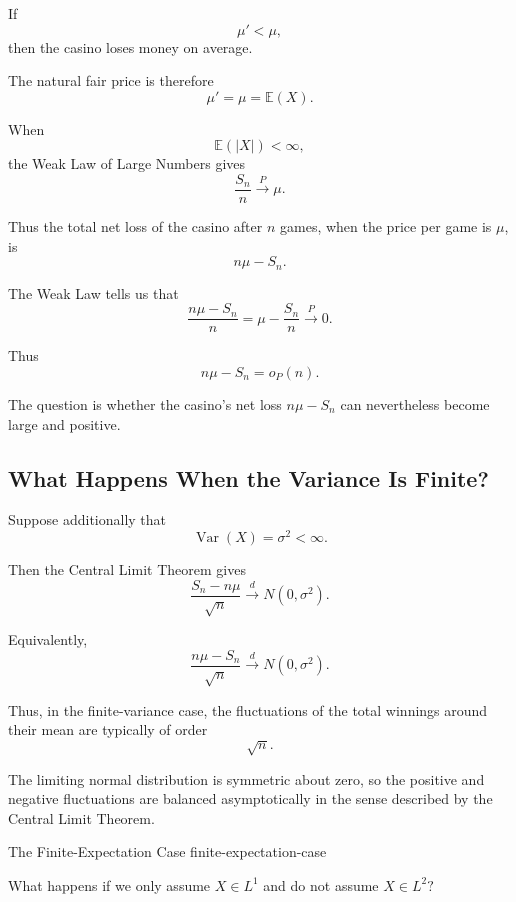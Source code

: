 \medskip

If
\[
\mu'<\mu,
\]
then the casino loses money on average.

\medskip

The natural fair price is therefore
\[
\boxed{
\mu'=\mu=\mathbb{E}(X).
}
\]

When
\[
\mathbb{E}(|X|)<\infty,
\]
the Weak Law of Large Numbers gives
\[
\frac{S_n}{n}
\xrightarrow{P}
\mu.
\]

Thus the total net loss of the casino after $n$ games, when the price
per game is $\mu$, is
\[
n\mu-S_n.
\]

\begin{observation}

The Weak Law tells us that
\[
\frac{n\mu-S_n}{n}
=
\mu-\frac{S_n}{n}
\xrightarrow{P}0.
\]

Thus
\[
n\mu-S_n=o_P(n).
\]

The question is whether the casino's net loss
\(
n\mu-S_n
\)
can nevertheless become large and positive.

\end{observation}



\subsection{What Happens When the Variance Is Finite?}

Suppose additionally that
\[
\operatorname{Var}(X)=\sigma^2<\infty.
\]

Then the Central Limit Theorem gives
\[
\frac{S_n-n\mu}{\sqrt{n}}
\xrightarrow{d}
N(0,\sigma^2).
\]

Equivalently,
\[
\frac{n\mu-S_n}{\sqrt{n}}
\xrightarrow{d}
N(0,\sigma^2).
\]

Thus, in the finite-variance case, the fluctuations of the total
winnings around their mean are typically of order
\[
\sqrt{n}.
\]

The limiting normal distribution is symmetric about zero, so the
positive and negative fluctuations are balanced asymptotically in the
sense described by the Central Limit Theorem.

\begin{question}{The Finite-Expectation Case}
{finite-expectation-case}

What happens if we only assume
\(
X\in L^1
\)
and do not assume
\(
X\in L^2?
\)

\end{question}



